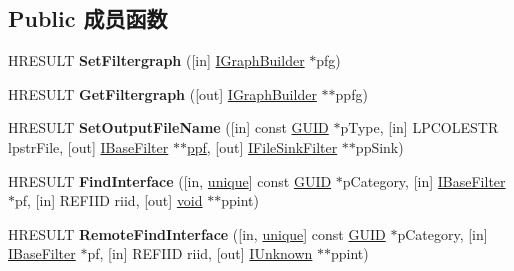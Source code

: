 \subsection*{Public 成员函数}
\begin{DoxyCompactItemize}
\item 
\mbox{\label{interface_i_capture_graph_builder_a612321366a683527dfc6a00438c9092e}} 
H\+R\+E\+S\+U\+LT {\bfseries Set\+Filtergraph} (\mbox{[}in\mbox{]} \hyperlink{interface_i_graph_builder}{I\+Graph\+Builder} $\ast$pfg)
\item 
\mbox{\label{interface_i_capture_graph_builder_a64606b1f26e2692f6905490920788434}} 
H\+R\+E\+S\+U\+LT {\bfseries Get\+Filtergraph} (\mbox{[}out\mbox{]} \hyperlink{interface_i_graph_builder}{I\+Graph\+Builder} $\ast$$\ast$ppfg)
\item 
\mbox{\label{interface_i_capture_graph_builder_a7fac8b062ca094353b2a203fa1ffe61a}} 
H\+R\+E\+S\+U\+LT {\bfseries Set\+Output\+File\+Name} (\mbox{[}in\mbox{]} const \hyperlink{interface_g_u_i_d}{G\+U\+ID} $\ast$p\+Type, \mbox{[}in\mbox{]} L\+P\+C\+O\+L\+E\+S\+TR lpstr\+File, \mbox{[}out\mbox{]} \hyperlink{interface_i_base_filter}{I\+Base\+Filter} $\ast$$\ast$\hyperlink{struct__paraformat}{ppf}, \mbox{[}out\mbox{]} \hyperlink{interface_i_file_sink_filter}{I\+File\+Sink\+Filter} $\ast$$\ast$pp\+Sink)
\item 
\mbox{\label{interface_i_capture_graph_builder_ac10340c04fad28d4aca93a617406c1b7}} 
H\+R\+E\+S\+U\+LT {\bfseries Find\+Interface} (\mbox{[}in, \hyperlink{interfaceunique}{unique}\mbox{]} const \hyperlink{interface_g_u_i_d}{G\+U\+ID} $\ast$p\+Category, \mbox{[}in\mbox{]} \hyperlink{interface_i_base_filter}{I\+Base\+Filter} $\ast$pf, \mbox{[}in\mbox{]} R\+E\+F\+I\+ID riid, \mbox{[}out\mbox{]} \hyperlink{interfacevoid}{void} $\ast$$\ast$ppint)
\item 
\mbox{\label{interface_i_capture_graph_builder_a217bb7cebd2b5d0eda426165f0f6abfd}} 
H\+R\+E\+S\+U\+LT {\bfseries Remote\+Find\+Interface} (\mbox{[}in, \hyperlink{interfaceunique}{unique}\mbox{]} const \hyperlink{interface_g_u_i_d}{G\+U\+ID} $\ast$p\+Category, \mbox{[}in\mbox{]} \hyperlink{interface_i_base_filter}{I\+Base\+Filter} $\ast$pf, \mbox{[}in\mbox{]} R\+E\+F\+I\+ID riid, \mbox{[}out\mbox{]} \hyperlink{interface_i_unknown}{I\+Unknown} $\ast$$\ast$ppint)
$$
\end{DoxyCompactItemize}

